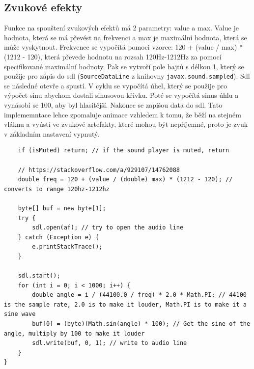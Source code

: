 \documentclass{article}
\begin{document}
\subsection{Zvukové efekty}
Funkce na spouštení zvukových efektů má 2 parametry: value a max. Value je hodnota, která se má převést na frekvenci a max je maximální hodnota, která se může vyskytnout. Frekvence se vypočítá pomoci vzorce: 120 + (value / max) * (1212 - 120), která převede hodnotu na rozsah 120Hz-1212Hz za pomocí specifikované maximální hodnoty. Pak se vytvoří pole bajtů s délkou 1, který se použije pro zápis do sdl (\verb|SourceDataLine| z knihovny \verb|javax.sound.sampled|). Sdl se následné otevře a spustí. V cyklu se vypočítá úhel, který se použije pro výpočet sinu abychom dostali sinusovou křivku. Poté se vypočítá sinus úhlu a vynásobí se 100, aby byl hlasitější. Nakonec se zapišou data do sdl. Tato implememntace lehce zpomaluje animace vzhledem k tomu, že běží na stejném vláknu a vyústí ve zvukové artefakty, které mohou být nepříjemné, proto je zvuk v základním nastavení vypnutý.
\begin{verbatim}
    if (isMuted) return; // if the sound player is muted, return

    // https://stackoverflow.com/a/929107/14762088
    double freq = 120 + (value / (double) max) * (1212 - 120); // converts to range 120hz-1212hz

    byte[] buf = new byte[1];
    try {
        sdl.open(af); // try to open the audio line
    } catch (Exception e) {
        e.printStackTrace();
    }

    sdl.start();
    for (int i = 0; i < 1000; i++) {
        double angle = i / (44100.0 / freq) * 2.0 * Math.PI; // 44100 is the sample rate, 2.0 is to make it louder, Math.PI is to make it a sine wave
        buf[0] = (byte)(Math.sin(angle) * 100); // Get the sine of the angle, multiply by 100 to make it louder
        sdl.write(buf, 0, 1); // write to audio line
    }
}
\end{verbatim}
\end{document}
